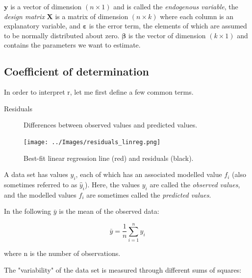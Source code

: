 $\mathbf{y}$ is a vector of dimension $(n \times 1)$ and is called the \emph{endogenous variable}, the \emph{design matrix}  $\mathbf{X}$ is a matrix of dimension $(n \times k)$ where each column is an explanatory variable, and $\mathbf{\varepsilon }$ is the error term, the elements of which are assumed to be normally distributed about zero. $\mathbf{\beta }$ is the vector of dimension $(k \times 1)$ and contains the parameters we want to estimate.

\subsection{Coefficient of determination}

In order to interpret r, let me first define a few common terms.

\begin{description}
  \item[Residuals] Differences between observed values and predicted values.
\end{description}

\begin{figure}
  \centering
  \texttt{[image: ../Images/residuals\_linreg.png]}\\
  \caption{Best-fit linear regression line (red) and residuals (black). }\label{fig:residuals}
\end{figure}

A data set has values $y_i$, each of which has an associated modelled value $f_i$ (also sometimes referred to as $\hat{y}_i$). Here, the values $y_i$ are called the \emph{observed values}, and the modelled values $f_i$ are sometimes called the \emph{predicted values}.

In the following $\bar{y}$ is the mean of the observed data:

\begin{equation}
  \bar{y}=\frac{1}{n}\sum_{i=1}^n y_i
\end{equation}

where n is the number of observations.

The "variability" of the data set is measured through different sums of squares:

\vspace{5 mm}

